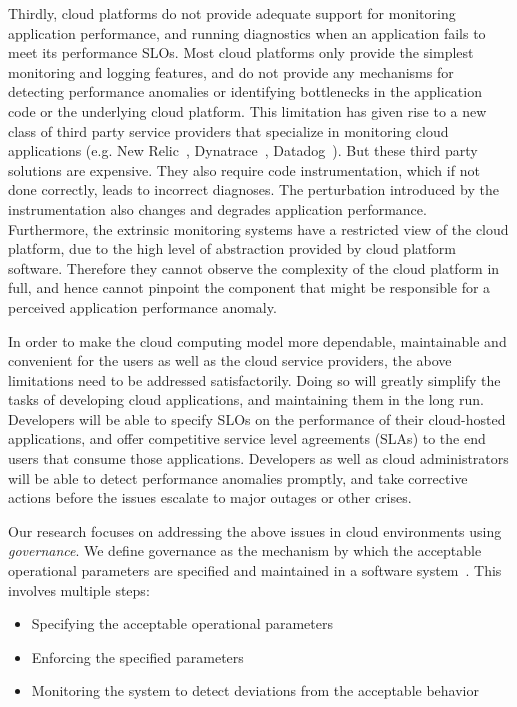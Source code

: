 Thirdly, cloud platforms do not provide adequate support for monitoring application performance,
and running diagnostics when an application fails to meet its performance SLOs.
Most cloud platforms only provide the simplest monitoring and logging features,
and do not provide any mechanisms for detecting performance anomalies or identifying
bottlenecks in the application code or the underlying cloud platform. This limitation has given rise
to a new class of third party service providers that specialize in monitoring cloud applications
(e.g. New Relic~\cite{newrelic}, Dynatrace~\cite{dynatrace}, Datadog~\cite{datadog}). But these 
third party solutions are expensive. They also require code instrumentation, which
if not done correctly, leads to incorrect diagnoses. The perturbation
introduced by the instrumentation also changes and degrades application performance.
Furthermore, the extrinsic monitoring systems have a restricted view 
of the cloud platform, due to the high level of abstraction provided by cloud platform software.
Therefore they cannot observe the complexity of the cloud platform in full, and hence cannot pinpoint
the component that might be responsible for a perceived application performance anomaly.

In order to make the cloud computing model more dependable, maintainable and convenient for the users as well
as the cloud service providers, the above limitations need to be addressed satisfactorily.
Doing so will greatly simplify the tasks of developing cloud applications, and maintaining 
them in the long run. Developers will be able to specify SLOs on the performance of
their cloud-hosted applications, and offer competitive service level agreements (SLAs) to the end users that consume those
applications. Developers as well as cloud administrators will be able to detect performance anomalies
promptly, and take corrective actions before the issues escalate to major
outages or other crises.

Our research focuses on addressing the above issues in cloud environments 
using \textit{governance}. We define governance as the mechanism 
by which the acceptable operational parameters are specified and maintained in a 
software system~\cite{brown2005framing,gartner-soa-gov}. This involves multiple steps:
\begin{itemize}
\item Specifying the acceptable operational parameters
\item Enforcing the specified parameters
\item Monitoring the system to detect deviations from the acceptable behavior
\end{itemize}

